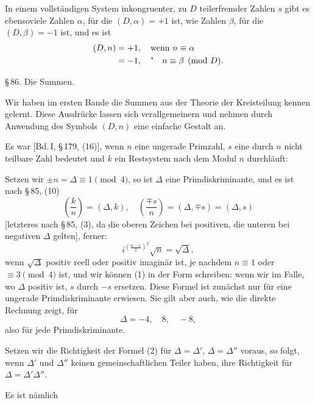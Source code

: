 In einem vollständigen System inkongruenter, zu $D$ teilerfremder Zahlen $s$ gibt es ebensoviele Zahlen $\alpha$, für die $(D, \alpha) = +1$ ist, wie Zahlen $\beta$, für die $(D, \beta) = -1$ ist, und es ist
\[
\begin{aligned}
(D,n) &= +1, \quad \text{wenn } n \equiv \alpha \\
&= -1, \quad \text{\textquotedbl} \quad n \equiv \beta \pmod{D}.
\end{aligned}
\]

\begin{center}
\S\,86. Die  Summen.
\end{center}

Wir haben im ersten Bande die  Summen aus der Theorie der Kreisteilung kennen gelernt. Diese Ausdrücke lassen sich verallgemeinern und nehmen durch Anwendung des Symbols $(D, n)$ eine einfache Gestalt an.

Es war [Bd.\,I, \S\,179, (16)], wenn $n$ eine ungerade Primzahl, $s$ eine durch $n$ nicht teilbare Zahl bedeutet und $k$ ein Restsystem nach dem Modul $n$ durchläuft:

Setzen wir $\pm n = \varDelta \equiv 1 \pmod{4}$, so ist $\varDelta$ eine Primdiskriminante, und es ist nach \S\,85, (10)
\[
\left(\frac{k}{n}\right) = (\varDelta, k), \quad \left(\frac{\mp s}{n}\right) = (\varDelta, \mp s) = (\varDelta, s)
\]
[letzteres nach \S\,85, (3), da die oberen Zeichen bei positiven, die unteren bei negativen $\varDelta$ gelten], ferner:
\[
i^{\left(\frac{n-1}{2}\right)^2} \sqrt{n} = \sqrt{\varDelta},
\]
wenn $\sqrt{\varDelta}$ positiv reell oder positiv imaginär ist, je nachdem $n \equiv 1$ oder $\equiv 3 \pmod{4}$ ist, und wir können (1) in der Form schreiben:
wenn wir im Falle, wo $\varDelta$ positiv ist, $s$ durch $-s$ ersetzen. Diese Formel ist zunächst nur für eine ungerade Primdiskriminante erwiesen. Sie gilt aber auch, wie die direkte Rechnung zeigt, für
\[
\varDelta = -4, \quad 8, \quad -8,
\]
also für jede Primdiskriminante.

Setzen wir die Richtigkeit der Formel (2) für $\varDelta = \varDelta'$, $\varDelta = \varDelta''$ voraus, so folgt, wenn $\varDelta'$ und $\varDelta''$ keinen gemeinschaftlichen Teiler haben, ihre Richtigkeit für $\varDelta = \varDelta' \varDelta''$.

Es ist nämlich
